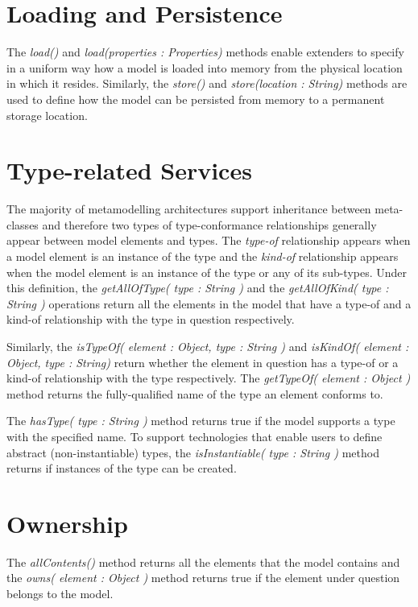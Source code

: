 \section{Loading and Persistence}

The \emph{load()} and \emph{load(properties : Properties)} methods enable extenders to specify in a uniform way how a model is loaded into memory from the physical location in which it resides. Similarly, the \emph{store()} and \emph{store(location : String)} methods are used to define how the model can be persisted from memory to a permanent storage location.

\section{Type-related Services}

The majority of metamodelling architectures support inheritance between meta-classes and therefore two types of type-conformance relationships generally appear between model elements and types. The \emph{type-of} relationship appears when a model element is an instance of the type and the \emph{kind-of} relationship appears when the model element is an instance of the type or any of its sub-types. Under this definition, the \emph{getAllOfType( type : String )} and the \emph{getAllOfKind( type : String )} operations return all the elements in the model that have a type-of and a kind-of relationship with the type in question respectively.

Similarly, the \emph{isTypeOf( element : Object, type : String )} and \emph{isKindOf( element : Object, type : String)} return whether the element in question has a type-of or a kind-of relationship with the type respectively. The \emph{getTypeOf( element : Object )} method returns the fully-qualified name of the type an element conforms to.

The \emph{hasType( type : String )} method returns true if the model supports a type with the specified name. To support technologies that enable users to define abstract (non-instantiable) types, the \emph{isInstantiable( type : String )} method returns if instances of the type can be created.

\section{Ownership}

The \emph{allContents()} method returns all the elements that the model contains and the \emph{owns( element : Object )} method returns true if the element under question belongs to the model.

